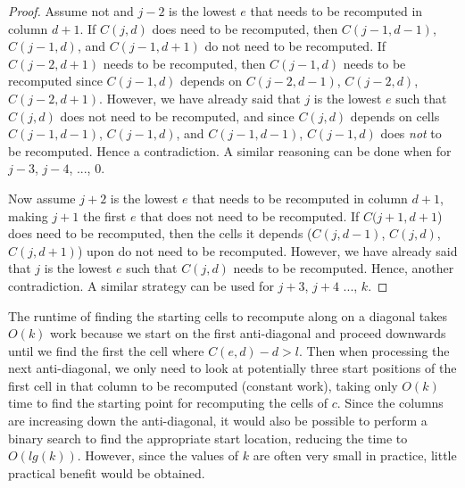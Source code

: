 \begin{proof}
Assume not and $j-2$ is the lowest $e$ that needs to be recomputed in column $d+1$.  If $C(j,d)$ does need to be recomputed, then $C(j-1,d-1)$, $C(j-1,d)$, and $C(j-1,d+1)$ do not need to be recomputed.  If $C(j-2,d+1)$ needs to be recomputed, then $C(j-1,d)$ needs to be recomputed since $C(j-1,d)$ depends on $C(j-2,d-1)$, $C(j-2,d)$, $C(j-2,d+1)$.  However, we have already said that $j$ is the lowest $e$ such that $C(j,d)$ does not need to be recomputed, and since $C(j,d)$ depends on cells $C(j-1,d-1)$, $C(j-1,d)$, and $C(j-1,d-1)$, $C(j-1,d)$ does \emph{not} to be recomputed.  Hence a contradiction.  A similar reasoning can be done when for $j-3$, $j-4$, ..., 0.

Now assume $j+2$ is the lowest $e$ that needs to be recomputed in column $d+1$, making $j+1$ the first $e$ that does not need to be recomputed.  If $C(j+1,d+1$) does need to be recomputed, then the cells it depends ($C(j,d-1)$, $C(j,d)$, $C(j,d+1)$) upon do not need to be recomputed.  However, we have already said that $j$ is the lowest $e$ such that $C(j,d)$ needs to be recomputed.  Hence, another contradiction.  A similar strategy can be used for $j+3$, $j+4$ ..., $k$.


\end{proof}

The runtime of finding the starting cells to recompute along on a diagonal takes $O(k)$ work because we start on the first anti-diagonal and proceed downwards until we find the first the cell where $C(e,d) - d > l$.
Then when processing the next anti-diagonal, we only need to look at potentially three start positions of the first cell in that column to be recomputed (constant work), taking only $O(k)$ time to find the starting point for recomputing the cells of $c$.  Since the columns are increasing down the anti-diagonal, it would also be possible to perform a binary search to find the appropriate start location, reducing the time to $O(lg(k))$.
However, since the values of $k$ are often very small in practice, little practical benefit would be obtained.


